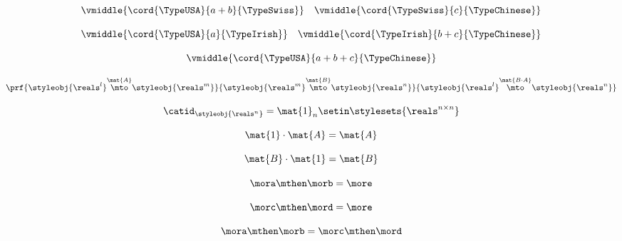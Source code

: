 \begin{forslides}
    \begin{equation}
        \label{eq:semicats-slides-128}
        \vmiddle{\cord{\TypeUSA}{a + b}{\TypeSwiss}} \quad \vmiddle{\cord{\TypeSwiss}{c}{\TypeChinese}}
    \end{equation}

    \begin{equation}
        \label{eq:semicats-slides-129}
        \vmiddle{\cord{\TypeUSA}{a}{\TypeIrish}} \quad \vmiddle{\cord{\TypeIrish}{b + c}{\TypeChinese}}
    \end{equation}

    \begin{equation}
        \label{eq:semicats-slides-130}
        \vmiddle{\cord{\TypeUSA}{a + b + c}{\TypeChinese}}
    \end{equation}

    \begin{equation}
        \label{eq:semicats-slides-131}
        \prf{
            \styleobj{\reals^l} \overset{\mat{A}}{\mto} \styleobj{\reals^m}
        }{
            \styleobj{\reals^m} \overset{\mat{B}}{\mto} \styleobj{\reals^n}
        }{
            \styleobj{\reals^l} \overset{\mat{B \cdot A}}{\mto} \styleobj{\reals^n}
        }
    \end{equation}

    \begin{equation}
        \label{eq:semicats-slides-132}
        \catid_{\styleobj{\reals^n}} = \mat{1}_n \setin \stylesets{\reals^{n \times n}}
    \end{equation}

    \begin{equation}
        \label{eq:semicats-slides-133}
        \mat{1} \cdot \mat{A} = \mat{A}
    \end{equation}

    \begin{equation}
        \label{eq:semicats-slides-134}
        \mat{B} \cdot \mat{1} = \mat{B}
    \end{equation}

    \begin{equation}
        \label{eq:semicats-slides-135}
        \mora \mthen \morb = \more
    \end{equation}

    \begin{equation}
        \label{eq:semicats-slides-136}
        \morc \mthen \mord = \more
    \end{equation}

    \begin{equation}
        \label{eq:semicats-slides-137}
        \mora \mthen \morb = \morc \mthen \mord
    \end{equation}


\end{forslides}
